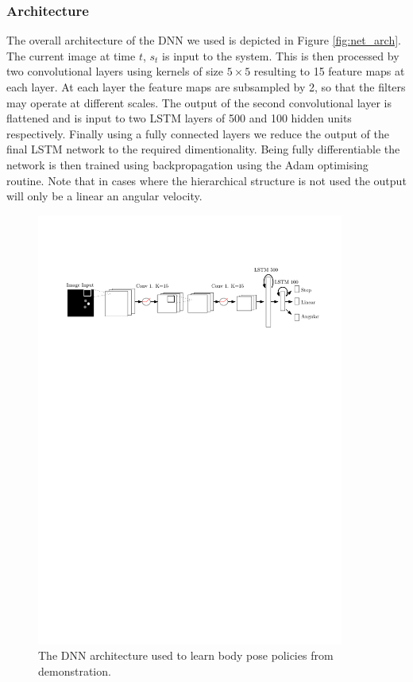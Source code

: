 \documentclass[a4paper,11pt]{report}
\begin{document}
\subsubsection{Architecture}
The overall architecture of the DNN we used is depicted in Figure \ref{fig:net_arch}. The current image at time $t$, $s_t$ is input to the system. This is then processed by two convolutional layers using kernels of size $5\times5$ resulting to 15 feature maps at each layer. At each layer the feature maps are subsampled by 2, so that the filters may operate at different scales. The output of the second convolutional layer is flattened and is input to two LSTM layers of 500 and 100 hidden units respectively. Finally using a fully connected layers we reduce the output of the final LSTM network to the required dimentionality. Being fully differentiable the network is then trained using backpropagation using the Adam optimising routine. Note that in cases where the hierarchical structure is not used the output will only be a linear an angular velocity.

	\begin{figure}
	\centering
	    \includegraphics[width=0.9\textwidth]{figures/net.pdf}
	  \caption[DNN Architecture]{The DNN architecture used to learn body pose policies from demonstration.}
	  \label{fig:pipeline}
	\end{figure}
\end{document}
